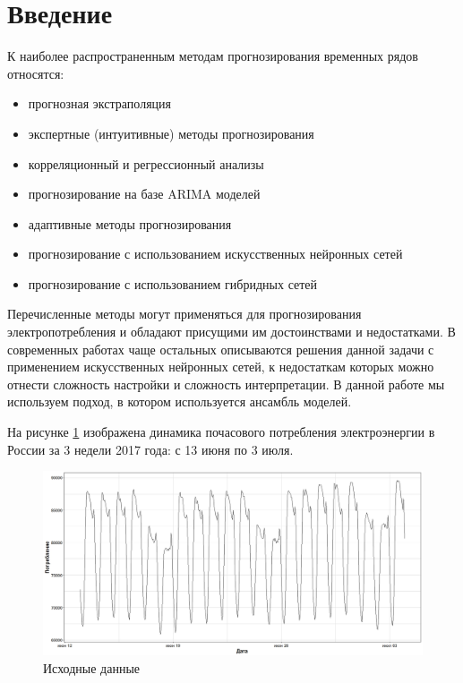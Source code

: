 \documentclass[60x84/16,8pt]{ittmm}
\begin{document}

\maketitle

\section{Введение}
\label{sec:intro}
К наиболее распространенным методам прогнозирования временных рядов относятся:
\begin{itemize}
    \item прогнозная экстраполяция
    \item экспертные (интуитивные) методы прогнозирования
    \item корреляционный и регрессионный анализы
    \item прогнозирование на базе ARIMA моделей
    \item адаптивные методы прогнозирования
    \item прогнозирование с использованием искусственных нейронных сетей
    \item прогнозирование с использованием гибридных сетей
\end{itemize}

Перечисленные методы могут применяться для прогнозирования электропотребления и
обладают присущими им достоинствами и недостатками. В современных работах чаще
остальных описываются решения данной задачи с применением искусственных
нейронных сетей, к недостаткам которых можно отнести сложность настройки и
сложность интерпретации. В данной работе мы используем подход, в котором
используется ансамбль моделей.

На рисунке \ref{fig:data} изображена динамика почасового потребления электроэнергии в
России за 3 недели 2017 года: с 13 июня по 3 июля.
\begin{figure}
  \centering
  \includegraphics[width=0.6\linewidth]{Ru/train_dataset.jpeg}
  \caption{Исходные данные}
  \label{fig:data}
\end{figure}
\end{document}
